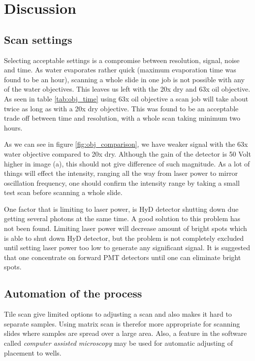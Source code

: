 \chapter{Discussion}

\section{Scan settings}
Selecting acceptable settings is a compromise between resolution, signal, noise and time. As water evaporates rather quick (maximum evaporation time was found to be an hour), scanning a whole slide in one job is not possible with any of the water objectives. This leaves us left with the 20x dry and 63x oil objective. As seen in table \ref{tab:obj_time} using 63x oil objective a scan job will take about twice as long as with a 20x dry objective. This was found to be an acceptable trade off between time and resolution, with a whole scan taking minimum two hours.

As we can see in figure \ref{fig:obj_comparison}, we have weaker signal with the 63x water objective compared to 20x dry. Although the gain of the detector is 50 Volt higher in image (a), this should not give difference of such magnitude. As a lot of things will effect the intensity, ranging all the way from laser power to mirror oscillation frequency, one should confirm the intensity range by taking a small test scan before scanning a whole slide.

One factor that is limiting to laser power, is HyD detector shutting down due getting several photons at the same time. A good solution to this problem has not been found. Limiting laser power will decrease amount of bright spots which is able to shut down HyD detector, but the problem is not completely excluded until setting laser power too low to generate any significant signal. It is suggested that one concentrate on forward PMT detectors until one can eliminate bright spots.

\section{Automation of the process}
Tile scan give limited options to adjusting a scan and also makes it hard to separate samples. Using matrix scan is therefor more appropriate for scanning slides where samples are spread over a large area. Also, a feature in the software called \textit{computer assisted microscopy} may be used for automatic adjusting of placement to wells.



